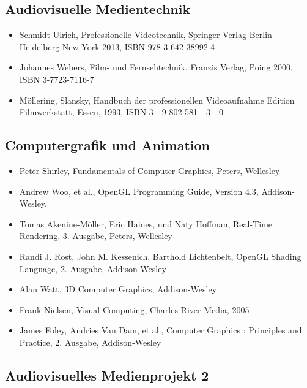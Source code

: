 \subsection*{Audiovisuelle
Medientechnik}\label{audiovisuelle-medientechnik-3}

\begin{itemize}
\item
  Schmidt Ulrich, Professionelle Videotechnik, Springer-Verlag Berlin
  Heidelberg New York 2013, ISBN 978-3-642-38992-4
\item
  Johannes Webers, Film- und Fernsehtechnik, Franzis Verlag, Poing 2000,
  ISBN 3-7723-7116-7
\item
  Möllering, Slansky, Handbuch der professionellen Videoaufnahme Edition
  Filmwerkstatt, Essen, 1993, ISBN 3 - 9 802 581 - 3 - 0
\end{itemize}

\subsection*{Computergrafik und
Animation}\label{computergrafik-und-animation-3}

\begin{itemize}
\item
  Peter Shirley, Fundamentals of Computer Graphics, Peters, Wellesley
\item
  Andrew Woo, et al., OpenGL Programming Guide, Version 4.3,
  Addison-Wesley,
\item
  Tomas Akenine-Möller, Eric Haines, und Naty Hoffman, Real-Time
  Rendering, 3. Ausgabe, Peters, Wellesley
\item
  Randi J. Rost, John M. Kessenich, Barthold Lichtenbelt, OpenGL Shading
  Language, 2. Ausgabe, Addison-Wesley
\item
  Alan Watt, 3D Computer Graphics, Addison-Wesley
\item
  Frank Nielsen, Visual Computing, Charles River Media, 2005
\item
  James Foley, Andries Van Dam, et al., Computer Graphics : Principles
  and Practice, 2. Ausgabe, Addison-Wesley
\end{itemize}

\subsection*{Audiovisuelles Medienprojekt
2}\label{audiovisuelles-medienprojekt-2-3}

